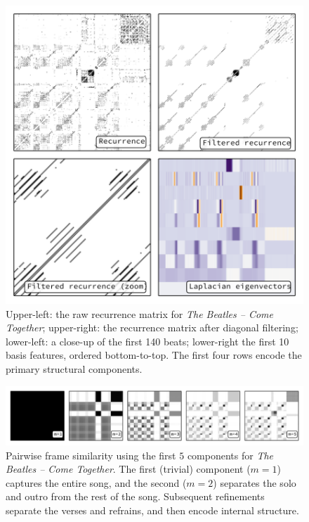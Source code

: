 \documentclass{article}
\begin{document}
\begin{figure}
\centering
\includegraphics[width=\columnwidth]{figs/recurrence}
\caption{Upper-left: the raw recurrence matrix for \emph{The Beatles -- Come Together}; upper-right: the
recurrence matrix after diagonal filtering; lower-left: a close-up of the first 140 beats; lower-right the first
10 basis features, ordered bottom-to-top.  The first four rows encode the primary structural components.\label{recurrence}}
\end{figure}

 
\begin{figure}
\centering
\includegraphics[width=\textwidth]{figs/lowrank}
\caption{Pairwise frame similarity using the first $5$ components for \emph{The Beatles -- Come Together}.  The first
(trivial) component ($m=1$) captures the entire song, and the second ($m=2$) separates the solo and outro from the
rest of the song.  Subsequent refinements separate the verses and refrains, and then encode internal structure.\label{lowrank}}
\end{figure}
\end{document}
